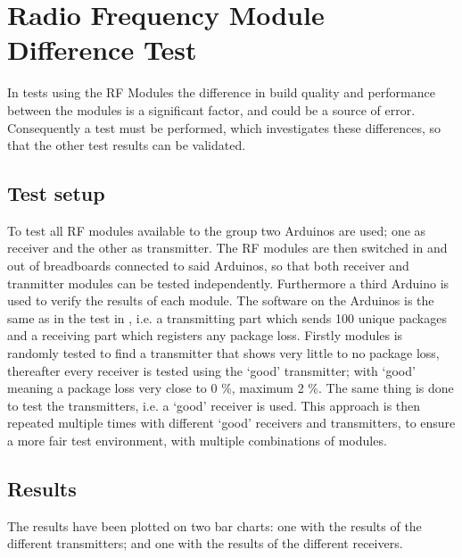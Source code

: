 \chapter{Radio Frequency Module Difference Test} %
\label{cha:radio_frequency_module_difference_test}
In tests using the RF Modules the difference in build quality and performance between the modules is a significant factor, and could be a source of error.
Consequently a test must be performed, which investigates these differences, so that the other test results can be validated.

\section*{Test setup}
To test all RF modules available to the group two Arduinos are used; one as receiver and the other as transmitter.
The RF modules are then switched in and out of breadboards connected to said Arduinos, so that both receiver and tranmitter modules can be tested independently.
Furthermore a third Arduino is used to verify the results of each module.
The software on the Arduinos is the same as in the test in , i.e. a transmitting part which sends 100 unique packages and a receiving part which registers any package loss. 
Firstly modules is randomly tested to find a transmitter that shows very little to no package loss, thereafter every receiver is tested using the \enquote*{good} transmitter; with \enquote*{good} meaning a package loss very close to 0 \%, maximum 2 \%.
The same thing is done to test the transmitters, i.e. a \enquote*{good} receiver is used.
This approach is then repeated multiple times with different \enquote*{good} receivers and transmitters, to ensure a more fair test environment, with multiple combinations of modules.

\section*{Results}
The results have been plotted on two bar charts: one with the results of the different transmitters; 
and one with the results of the different receivers.

